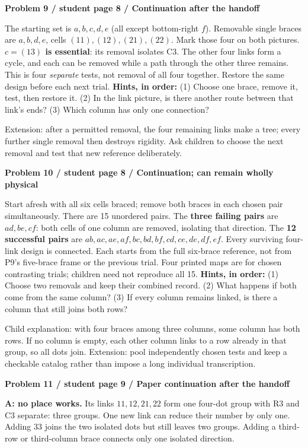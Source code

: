 \documentclass[letterpaper,11pt]{article}
\newcommand{\sub}[1]{\par\textbf{#1}\par}
\newcommand{\task}[3]{\sub{Problem #1 / student page #2 / #3}}
\newcommand{\hints}[3]{\textbf{Hints, in order:} (1) #1 (2) #2 (3) #3\par}
\begin{document}
\task{9}{8}{Continuation after the handoff}
The starting set is $a,b,c,d,e$ (all except bottom-right $f$). Removable single braces are \textbf{$a,b,d,e$}, cells $(11),(12),(21),(22)$. Mark those four on both pictures. \textbf{$c=(13)$ is essential}: its removal isolates C3. The other four links form a cycle, and each can be removed while a path through the other three remains. This is four \emph{separate} tests, not removal of all four together. Restore the same design before each next trial.
\hints{Choose one brace, remove it, test, then restore it.}{In the link picture, is there another route between that link's ends?}{Which column has only one connection?}
Extension: after a permitted removal, the four remaining links make a tree; every further single removal then destroys rigidity. Ask children to choose the next removal and test that new reference deliberately.

\task{10}{8}{Continuation; can remain wholly physical}
Start afresh with all six cells braced; remove both braces in each chosen pair simultaneously. There are 15 unordered pairs. The \textbf{three failing pairs} are $ad,be,cf$: both cells of one column are removed, isolating that direction. The \textbf{12 successful pairs} are $ab,ac,ae,af,bc,bd,bf,cd,ce,de,df,ef$. Every surviving four-link design is connected. Each starts from the full six-brace reference, not from P9's five-brace frame or the previous trial. Four printed maps are for chosen contrasting trials; children need not reproduce all 15.
\hints{Choose two removals and keep their combined record.}{What happens if both come from the same column?}{If every column remains linked, is there a column that still joins both rows?}
Child explanation: with four braces among three columns, some column has both rows. If no column is empty, each other column links to a row already in that group, so all dots join. Extension: pool independently chosen tests and keep a checkable catalog rather than impose a long individual transcription.

\task{11}{9}{Paper continuation after the handoff}
\textbf{A: no place works.} Its links $11,12,21,22$ form one four-dot group with R3 and C3 separate: three groups. One new link can reduce their number by only one. Adding $33$ joins the two isolated dots but still leaves two groups. Adding a third-row or third-column brace connects only one isolated direction.
\end{document}
